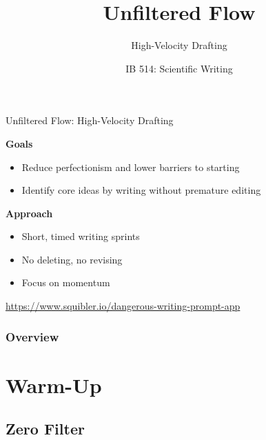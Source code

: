 \documentclass{beamer}
\title{Unfiltered Flow}
\subtitle{High-Velocity Drafting}
\author[]{IB 514: Scientific Writing}
\date[]{}
\begin{document}
\begin{frame}
  \titlepage
\end{frame}

\begin{frame}{Unfiltered Flow: High-Velocity Drafting}



\textbf{Goals}
\begin{itemize}
    \item Reduce perfectionism and lower barriers to starting
    \item Identify core ideas by writing without premature editing
\end{itemize}

\textbf{Approach}
\begin{itemize}
    \item Short, timed writing sprints
    \item No deleting, no revising
    \item Focus on momentum
\end{itemize}

\vspace{0.8em}
\url{https://www.squibler.io/dangerous-writing-prompt-app}


\end{frame}

  \begin{frame}
    \frametitle{Overview}
    \tableofcontents
  \end{frame}

\section{Warm-Up}

\subsection{Zero Filter}
\end{document}
